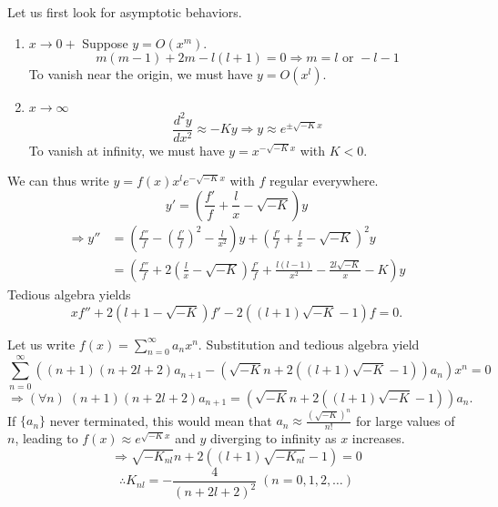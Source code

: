 \item
Let us first look for asymptotic behaviors.

\begin{enumerate}[wide, labelindent = 0pt, label = (\roman*)]
	\item $x \rightarrow 0+$
	      Suppose $y = O(x^m)$.
	      \[
		      m(m - 1) + 2m - l(l + 1) = 0
		      \Rightarrow m = l \text{ or } -l - 1
	      \]
	      To vanish near the origin, we must have $y = O(x^l)$.

	\item $x \rightarrow \infty$
	      \[
		      \frac{d^2 y}{dx^2} \approx -Ky
		      \Rightarrow y \approx e^{\pm \sqrt{-K}x}
	      \]
	      To vanish at infinity, we must have $y = x^{-\sqrt{-K}x}$ with $K < 0$.
\end{enumerate}

We can thus write $y = f(x) x^l e^{-\sqrt{-K}x}$ with $f$ regular everywhere.
\[
	y' = \left( \frac{f'}{f} + \frac{l}{x} - \sqrt{-K} \right) y
\]
\begin{align*}
	\Rightarrow y''
	 & = \left( \frac{f''}{f} - {\left( \frac{f'}{f} \right)}^2 - \frac{l}{x^2} \right) y
	+ {\left( \frac{f'}{f} + \frac{l}{x} - \sqrt{-K} \right)}^2 y                                                                                  \\
	 & = \left( \frac{f''}{f} + 2 \left( \frac{l}{x} - \sqrt{-K} \right) \frac{f'}{f} + \frac{l(l - 1)}{x^2} - \frac{2l\sqrt{-K}}{x} - K \right) y
\end{align*}
Tedious algebra yields
\[
	xf'' + 2(l + 1 - \sqrt{-K})f' - 2((l + 1)\sqrt{-K} - 1)f = 0.
\]

Let us write $f(x) = \sum_{n=0}^\infty a_n x^n$.
Substitution and tedious algebra yield
\[
	\sum_{n=0}^\infty ((n + 1)(n + 2l + 2)a_{n + 1} - (\sqrt{-K}n + 2((l + 1)\sqrt{-K} - 1)) a_n) x^n = 0
\]
\[
	\Rightarrow (\forall n)\; (n + 1)(n + 2l + 2)a_{n + 1} = (\sqrt{-K}n + 2((l + 1)\sqrt{-K} - 1)) a_n.
\]
If $\{a_n\}$ never terminated, this would mean that $a_n \approx \frac{{(\sqrt{-K})}^n}{n!}$ for large values of $n$,
leading to $f(x) \approx e^{\sqrt{-K}x}$ and $y$ diverging to infinity as $x$ increases.
\[
	\Rightarrow \sqrt{-K_{nl}}n + 2((l + 1)\sqrt{-K_{nl}} - 1) = 0
\]
\[
	\therefore K_{nl} = -\frac{4}{{(n + 2l + 2)}^2}\; (n = 0, 1, 2, \dots)
\]